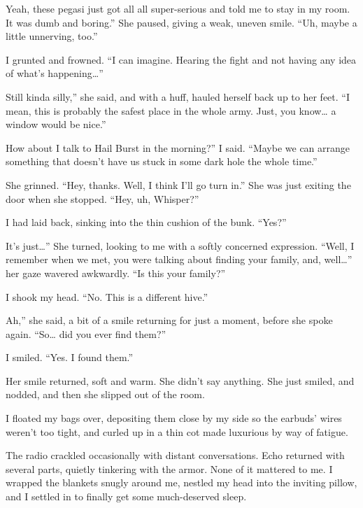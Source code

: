\leavevmode{}Yeah, these pegasi just got all all super-serious and told me to stay in my room. It was dumb and boring.” She paused, giving a weak, uneven smile. “Uh, maybe a little unnerving, too.”

I grunted and frowned. “I can imagine. Hearing the fight and not having any idea of what’s happening…”

\leavevmode{}Still kinda silly,” she said, and with a huff, hauled herself back up to her feet. “I mean, this is probably the safest place in the whole army. Just, you know… a window would be nice.”

\leavevmode{}How about I talk to Hail Burst in the morning?” I said. “Maybe we can arrange something that doesn’t have us stuck in some dark hole the whole time.”

She grinned. “Hey, thanks. Well, I think I’ll go turn in.” She was just exiting the door when she stopped. “Hey, uh, Whisper?”

I had laid back, sinking into the thin cushion of the bunk. “Yes?”

\leavevmode{}It’s just…” She turned, looking to me with a softly concerned expression. “Well, I remember when we met, you were talking about finding your family, and, well…” her gaze wavered awkwardly. “Is this your family?”

I shook my head. “No. This is a different hive.”

\leavevmode{}Ah,” she said, a bit of a smile returning for just a moment, before she spoke again. “So… did you ever find them?”

I smiled. “Yes. I found them.”

Her smile returned, soft and warm. She didn’t say anything. She just smiled, and nodded, and then she slipped out of the room.

I floated my bags over, depositing them close by my side so the earbuds’ wires weren’t too tight, and curled up in a thin cot made luxurious by way of fatigue.

The radio crackled occasionally with distant conversations. Echo returned with several parts, quietly tinkering with the armor. None of it mattered to me. I wrapped the blankets snugly around me, nestled my head into the inviting pillow, and I settled in to finally get some much-deserved sleep.
